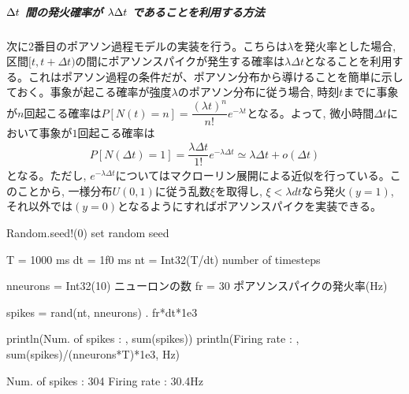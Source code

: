 \documentclass[letterpaper,10pt,english]{sphinxmanual}
\begin{document}
\subparagraph{\protect\(\Delta t\protect\) 間の発火確率が \protect\(\lambda\Delta t\protect\) であることを利用する方法}
\label{\detokenize{2-8_isi:delta-t-lambda-delta-t}}
次に2番目のポアソン過程モデルの実装を行う。こちらは\(\lambda\)を発火率とした場合, 区間\([t, t+\Delta t)\)の間にポアソンスパイクが発生する確率は\(\lambda \Delta t\)となることを利用する。これはポアソン過程の条件だが、ポアソン分布から導けることを簡単に示しておく。事象が起こる確率が強度\(\lambda\)のポアソン分布に従う場合, 時刻\(t\)までに事象が\(n\)回起こる確率は\(P[N(t)=n]=\dfrac{(\lambda t)^{n}}{n !} e^{-\lambda t}\)となる。よって, 微小時間\(\Delta t\)において事象が\(1\)回起こる確率は
\begin{equation*}
\begin{split}
P[N(\Delta t)=1]=\dfrac{\lambda \Delta t}{1 !} e^{-\lambda \Delta t}\simeq \lambda \Delta t+o(\Delta t)
\end{split}
\end{equation*}
となる。ただし, \(e^{-\lambda \Delta t}\)についてはマクローリン展開による近似を行っている。このことから, 一様分布\(U(0,1)\)に従う乱数\(\xi\)を取得し, \(\xi<\lambda dt\)なら発火\((y=1)\), それ以外では\((y=0)\)となるようにすればポアソンスパイクを実装できる。

\begin{sphinxVerbatim}[commandchars=\\\{\}]
Random.seed!(0) \PYGZsh{} set random seed

T = 1000 \PYGZsh{} ms
dt = 1f0 \PYGZsh{} ms
nt = Int32(T/dt) \PYGZsh{} number of timesteps

n\PYGZus{}neurons = Int32(10) \PYGZsh{} ニューロンの数
fr = 30 \PYGZsh{} ポアソンスパイクの発火率(Hz)

spikes = rand(nt, n\PYGZus{}neurons) .\PYGZlt{} fr*dt*1e\PYGZhy{}3

println(\PYGZdq{}Num. of spikes : \PYGZdq{}, sum(spikes))
println(\PYGZdq{}Firing rate : \PYGZdq{}, sum(spikes)/(n\PYGZus{}neurons*T)*1e3, \PYGZdq{}Hz\PYGZdq{})
\end{sphinxVerbatim}

\begin{sphinxVerbatim}[commandchars=\\\{\}]
Num. of spikes : 304
Firing rate : 30.4Hz
\end{sphinxVerbatim}
\end{document}
